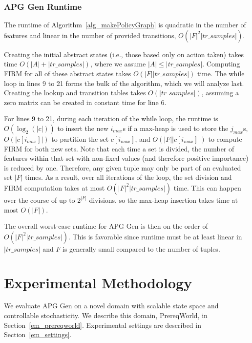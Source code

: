 \documentclass[letterpaper]{article} %
\begin{document}
\subsubsection{APG Gen Runtime}
The runtime of Algorithm~\ref{alg_makePolicyGraph} is quadratic in the number of features and linear in the number of provided transitions, $O(|F|^2 |tr\_samples|)$.



Creating the initial abstract states (i.e., those based only on action taken) takes time $O(|A| + |tr\_samples|)$, where we assume $|A| \leq |tr\_samples|$. Computing FIRM for all of these abstract states takes $O(|F| |tr\_samples|)$ time. The while loop in lines 9 to 21 forms the bulk of the algorithm, which we will analyze last. Creating the lookup and transition tables takes $O(|tr\_samples|)$, assuming a zero matrix can be created in constant time for line 6. 

For lines 9 to 21, during each iteration of the while loop, the runtime is $O(\log_2(|c|))$ to insert the new $i_{max}$s if a max-heap is used to store the $j_{max}$s, $O(|c[i_{max}]|)$ to partition the set $c[i_{max}]$, and $O(|F| |c[i_{max}]|)$ to compute FIRM for both new sets. Note that each time a set is divided, the number of features within that set with non-fixed values (and therefore positive importance) is reduced by one. Therefore, any given tuple may only be part of an evaluated set $|F|$ times. As a result, over all iterations of the loop, the set division and FIRM computation takes at most $O(|F|^2 |tr\_samples|)$ time. This can happen over the course of up to $2^{|F|}$ divisions, so the max-heap insertion takes time at most $O(|F|)$. 

The overall worst-case runtime for APG Gen is then on the order of $O(|F|^2 |tr\_samples|)$. This is favorable since runtime must be at least linear in $|tr\_samples|$ and $F$ is generally small compared to the number of tuples. 

\section{Experimental Methodology}
We evaluate APG Gen on a novel domain with scalable state space and controllable stochasticity. We describe this domain, PrereqWorld, in Section~\ref{em_prereqworld}. Experimental settings are described in Section~\ref{em_settings}.
\end{document}
